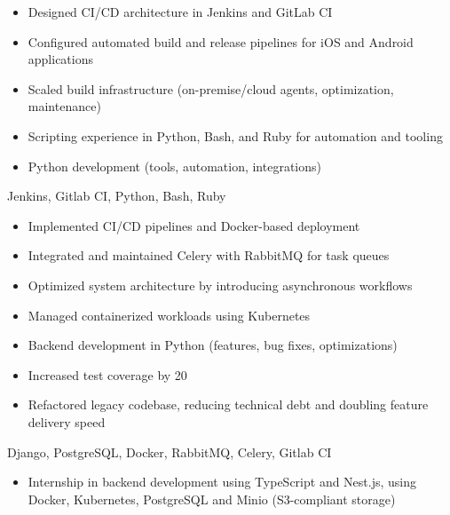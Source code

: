 \documentclass[10pt,a4paper,ragged2e,withhyper]{altacv}
\begin{document}
\begin{paracol}{2}


\begin{itemize}
\item Designed CI/CD architecture in Jenkins and GitLab CI
\item Configured automated build and release pipelines for iOS and Android applications
\item Scaled build infrastructure (on-premise/cloud agents, optimization, maintenance)
\item Scripting experience in Python, Bash, and Ruby for automation and tooling
\item Python development (tools, automation, integrations)

\end{itemize}
Jenkins, Gitlab CI, Python, Bash, Ruby

\divider


\begin{itemize}
\item Implemented CI/CD pipelines and Docker-based deployment
\item Integrated and maintained Celery with RabbitMQ for task queues
\item Optimized system architecture by introducing asynchronous workflows
\item Managed containerized workloads using Kubernetes
\item Backend development in Python (features, bug fixes, optimizations)
\item Increased test coverage by 20%
\item Refactored legacy codebase, reducing technical debt and doubling feature delivery speed

\end{itemize}
Django, PostgreSQL, Docker, RabbitMQ, Celery, Gitlab CI

\divider


\begin{itemize}
    \item Internship in backend development using TypeScript and Nest.js, using Docker, Kubernetes, PostgreSQL and Minio (S3-compliant storage)
\end{itemize}


\end{paracol}
\end{document}
